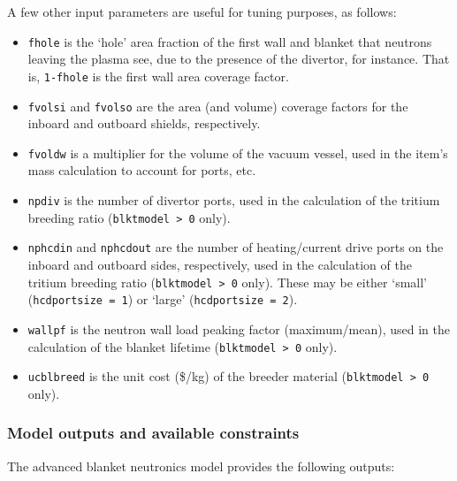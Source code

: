 \documentclass[11pt,a4paper]{report}
\begin{document}
A few other input parameters are useful for tuning purposes, as follows:

\begin{itemize}

\item \texttt{fhole} is the `hole' area fraction of the first wall and blanket
  that neutrons leaving the plasma see, due to the presence of the divertor,
  for instance. That is, \texttt{1-fhole} is the first wall area coverage
  factor. 

\item \texttt{fvolsi} and \texttt{fvolso} are the area (and volume) coverage
  factors for the inboard and outboard shields, respectively.

\item \texttt{fvoldw} is a multiplier for the volume of the vacuum vessel,
  used in the item's mass calculation to account for ports, etc.

\item \texttt{npdiv} is the number of divertor ports, used in the calculation
  of the tritium breeding ratio (\texttt{blktmodel > 0} only).

\item \texttt{nphcdin} and \texttt{nphcdout} are the number of heating/current
  drive ports on the inboard and outboard sides, respectively, used in the
  calculation of the tritium breeding ratio (\texttt{blktmodel > 0}
  only). These may be either `small' (\texttt{hcdportsize = 1}) or `large'
  (\texttt{hcdportsize = 2}).

\item \texttt{wallpf} is the neutron wall load peaking factor (maximum/mean),
  used in the calculation of the blanket lifetime (\texttt{blktmodel > 0}
  only).

\item \texttt{ucblbreed} is the unit cost (\$/kg) of the breeder material
  (\texttt{blktmodel > 0} only).

\end{itemize}

\subsubsection*{Model outputs and available constraints}

The advanced blanket neutronics model provides the following outputs:
\end{document}
